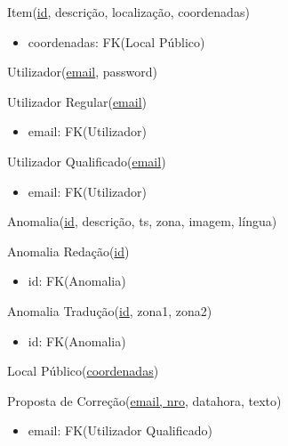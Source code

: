 \documentclass[12pt]{report}
\begin{document}
\begin{multicols}{2}
Item(\underline{id}, descrição, localização, coordenadas)
    \begin{itemize}
    \item coordenadas: FK(Local Público)
    \end{itemize}

\vspace{5mm}


Utilizador(\underline{email}, password)

Utilizador Regular(\underline{email})
    \begin{itemize}
    \item email: FK(Utilizador)
    \end{itemize}


Utilizador Qualificado(\underline{email})
    \begin{itemize}
    \item email: FK(Utilizador)
    \end{itemize}

\vspace{5mm}



Anomalia(\underline{id}, descrição, ts, zona, imagem, língua)


Anomalia Redação(\underline{id})
    \begin{itemize}
    \item id: FK(Anomalia)
    \end{itemize}


Anomalia Tradução(\underline{id}, zona1, zona2)
    \begin{itemize}
    \item id: FK(Anomalia)
    \end{itemize}


\vspace{5mm}


Local Público(\underline{coordenadas})


\vspace{5mm}


Proposta de Correção(\underline{email, nro}, datahora, texto)
    \begin{itemize}
    \item email: FK(Utilizador Qualificado)
    \end{itemize}




\end{multicols}
\end{document}
